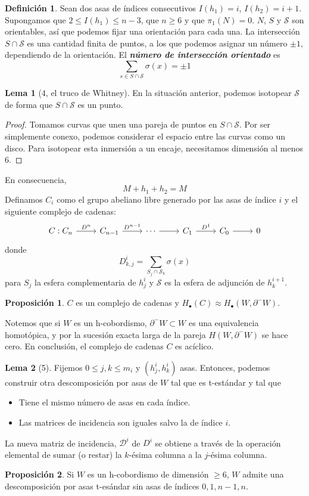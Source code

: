 \documentclass[spanish]{book}
\theoremstyle{definition}
\newtheorem*{defn}{Definición}
\newtheorem*{lema}{Lema}
\newtheorem*{prop}{Proposición}
\begin{document}
\begin{defn}
	Sean dos asas de índices consecutivos $I(h_1)=i$, $I(h_2)=i+1$. Supongamos que $2\leq I(h_1)\leq n-3$, que $n\geq6$ y que $\pi_1(N)=0$. $N$, $S$ y $\mathcal{S}$ son orientables, así que podemos fijar una orientación para cada una. La intersección $S\cap\mathcal{S}$ es una cantidad finita de puntos, a los que podemos asignar un número $\pm1$, dependiendo de la orientación. El \textbf{\textit{número de intersección orientado}} es
	\[\sum_{s\in S\cap \mathcal{S}}\sigma(x)=\pm1\]
\end{defn}
\begin{lema}[4, el truco de Whitney]
	En la situación anterior, podemos isotopear $\mathcal{S}$ de forma que $S\cap \mathcal{S}$ es un punto.
\end{lema}
\begin{proof}
	Tomamos curvas que unen una pareja de puntos en $S\cap \mathcal{S}$. Por ser simplemente conexo, podemos considerar el espacio entre las curvas como un disco. Para isotopear esta inmersión a un encaje, necesitamos dimensión al menos 6.
\end{proof}
En consecuencia,
\[M+h_1+h_2=M\]
Definamos $C_i$ como el grupo abeliano libre generado por las asas de índice $i$ y el siguiente complejo de cadenas:
\[\begin{tikzcd}
	C:C_n\arrow[r,"D^n"]&C_{n-1}\arrow[r,"D^{n-1}"]&\cdots\arrow[r]&C_1\arrow[r,"D^1"]&C_0\arrow[r]&0
\end{tikzcd}\]
donde
\[D_{k,j}^i=\sum_{S_j\cap\mathcal{S}_k}\sigma(x)\]
para $S_j$ la esfera complementaria de $h_j^i$ y $\mathcal{S}$ es la esfera de adjunción de $h^{i+1}_k$.
\begin{prop}
	$C$ es un complejo de cadenas y $H_\bullet(C)\approx H_\bullet(W,\partial^-W)$.
\end{prop}
Notemos que si $W$ es un h-cobordismo, $\partial^-W\subset W$ es una equivalencia homotópica, y por la sucesión exacta larga de la pareja $H(W,\partial^-W)$ se hace cero. En conclusión, el complejo de cadenas $C$ es acíclico.

\begin{lema}[5]
	Fijemos $0\leq j,k\leq m_i$ y $(h_j^i,h_k^i)$ asas. Entonces, podemos construir otra descomposición por asas de $W$ tal que es t-estándar y tal que
	\begin{itemize}
		\item Tiene el mismo número de asas en cada índice.
		\item Las matrices de incidencia son iguales salvo la de índice $i$.
	\end{itemize}
			La nueva matriz de incidencia, $\mathcal{D}^i$ de $D^i$ se obtiene a través de la operación elemental de sumar (o restar) la $k$-ésima columna a la $j$-ésima columna.
\end{lema}
\begin{prop}
	Si $W$ es un h-cobordismo de dimensión $\geq6$, $W$ admite una descomposición por asas t-esándar sin asas de índices $0,1, n-1,n$.
\end{prop}
\end{document}
